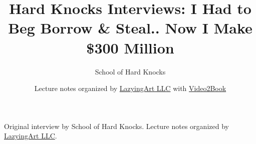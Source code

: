 \documentclass[11pt,oneside]{book}
\begin{document}
\frontmatter
\title{Hard Knocks Interviews: I Had to Beg Borrow \& Steal.. Now I Make \$300 Million}
\author{School of Hard Knocks}
\date{Lecture notes organized by \href{https://lazying.art}{LazyingArt LLC} with \href{https://github.com/lachlanchen/Video2Book}{Video2Book}}
\maketitle
\begin{center}
\small Original interview by School of Hard Knocks. Lecture notes organized by \href{https://lazying.art}{LazyingArt LLC}.
\end{center}
\clearpage
\mainmatter

\end{document}

